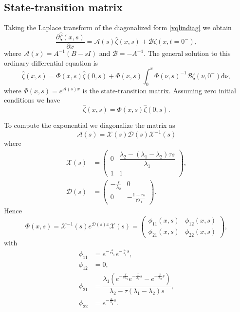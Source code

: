 \documentclass[preprint]{elsarticle}
\begin{document}
\subsection{State-transition matrix}
Taking the Laplace transform of the diagonalized form \eqref{vqlindiag} we obtain 
\begin{equation}
\dfrac{\partial \hat{\zeta} (x,s)}{\partial x} = \mathscr{A}(s)\hat{\zeta}(x,s) + \mathscr{B}\zeta(x,t=0^-),
\end{equation}
where $\mathscr{A}(s) = A^{-1}(B - sI)$ and $\mathscr{B} = -A^{-1}$. 
The general solution to this ordinary differential equation is 
\begin{equation}
\hat{\zeta}(x,s) = \Phi(x,s)\hat{\zeta}(0,s) +  \Phi(x,s) \int^x_0 \Phi(\nu,s)^{-1} \mathscr{B} \zeta(\nu,0^-)\text{d} \nu,
\end{equation}
where $\Phi(x,s) = e^{\mathscr{A}(s)x}$ is the state-transition matrix. Assuming zero initial conditions we have 
\begin{equation} \label{TFRiemann}
\hat{\zeta}(x,s) = \Phi(x,s)\hat{\zeta}(0,s).
\end{equation}

To compute the exponential we diagonalize the matrix as 
\begin{equation}
\mathscr{A}(s) = \mathscr{X}(s)\mathscr{D}(s)\mathscr{X}^{-1}(s)
\end{equation} 
where  
\begin{align}
\mathscr{X}(s) &= \begin{pmatrix}
0 & \dfrac{\lambda_2 - (\lambda_1 - \lambda_2) \tau s}{\lambda_1} \\
1 & 1
\end{pmatrix}, \\
\mathscr{D}(s) &= \begin{pmatrix}
-\frac{s}{\lambda_2} & 0 \\
 0 & -\frac{1+\tau s}{\tau \lambda_1}
\end{pmatrix}.
\end{align}
Hence
\begin{equation}
\Phi(x,s) =  \mathscr{X}^{-1}(s)e^{\mathscr{D}(s)x}\mathscr{X}(s) =
\begin{pmatrix}
\phi_{11}(x,s) & \phi_{12}(x,s) \\ 
\phi_{21}(x,s) & \phi_{22}(x,s)
\end{pmatrix},
\end{equation}
with
\begin{subequations} \label{TFv0q0tovxqx}
\begin{align}
\phi_{11} &= e^{-\frac{x}{\tau \lambda_1}}e^{-\frac{x}{\lambda_1}s}, \\ 
\phi_{12} &= 0, \\
\phi_{21} &= \dfrac{\lambda_1 \left( e^{-\frac{x}{\tau \lambda_1}}e^{-\frac{x}{\lambda_1}s} - e^{-\frac{x}{\lambda_2}s}\right)}{\lambda_2 - \tau (\lambda_1 - \lambda_2)s}, \\
\phi_{22} &= e^{-\frac{x}{\lambda_2}s}.
\end{align}
\end{subequations}
\end{document}
